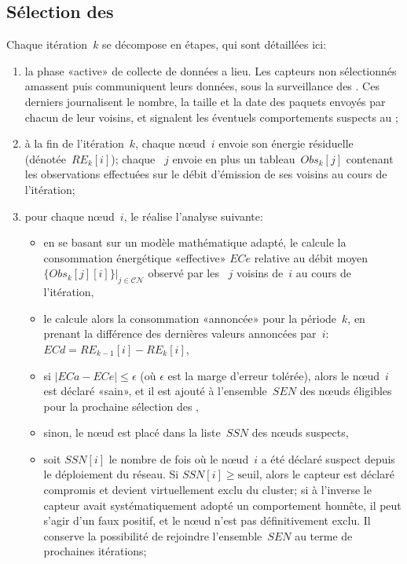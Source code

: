     \subsection{Sélection des \cns}

Chaque itération~$k$ se décompose en étapes, qui sont détaillées ici:
\begin{enumerate}
    \item la phase «active» de collecte de données a lieu. Les capteurs non sélectionnés amassent puis communiquent leurs données, sous la surveillance des \cns. Ces derniers journalisent le nombre, la taille et la date des paquets envoyés par chacun de leur voisins, et signalent les éventuels comportements suspects au \ch;
    \item à la fin de l'itération~$k$, chaque nœud~$i$ envoie son énergie résiduelle (dénotée~$RE_k[i]$); chaque \cn~$j$ envoie en plus un tableau~$Obs_k[j]$ contenant les observations effectuées sur le débit d'émission de ses voisins au cours de l'itération;
    \item pour chaque nœud~$i$, le \ch réalise l'analyse suivante:
        \begin{itemize}
            \item en se basant sur un modèle mathématique adapté, le \CH calcule la consommation énergétique «effective» $ECe$ relative au débit moyen\, $\{Obs_k[j][i]\}|_{j\in \mathcal{CN}}$ observé par les \cns~$j$ voisins de~$i$ au cours de l'itération,
            \item le \CH calcule alors la consommation «annoncée» pour la période~$k$, en prenant la différence des dernières valeurs annoncées par~$i$: $ECd=RE_{k-1}[i] - RE_k[i]$,
            \item si $|ECa-ECe|\leq\epsilon$ (où $\epsilon$ est la marge d'erreur tolérée), alors le nœud~$i$ est déclaré «sain», et il est ajouté à l'ensemble~$SEN$ des nœuds éligibles pour la prochaine sélection des \cns,
            \item sinon, le nœud est placé dans la liste~$SSN$ des nœuds suspects,
            \item soit $SSN[i]$ le nombre de fois où le nœud~$i$ a été déclaré suspect depuis le déploiement du réseau. Si $SSN[i] \ge \mathrm{seuil}$, alors le capteur est déclaré compromis et devient virtuellement exclu du cluster; si à l'inverse le capteur avait systématiquement adopté un comportement honnête, il peut s'agir d'un faux positif, et le nœud n'est pas définitivement exclu. Il conserve la possibilité de rejoindre l'ensemble~$SEN$ au terme de prochaines itérations;

\end{itemize}
\end{enumerate}
